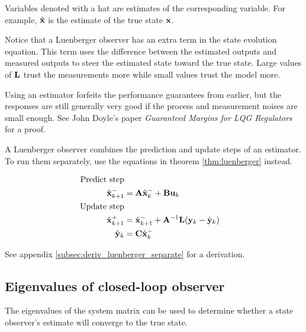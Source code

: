 Variables denoted with a hat are estimates of the corresponding variable. For
example, $\hat{\mathbf{x}}$ is the estimate of the true \gls{state} $\mathbf{x}$.

Notice that a Luenberger \gls{observer} has an extra term in the \gls{state}
evolution equation. This term uses the difference between the estimated
\glspl{output} and measured \glspl{output} to steer the estimated \gls{state}
toward the true \gls{state}. Large values of $\mathbf{L}$ trust the measurements
more while small values trust the \gls{model} more.

\begin{remark}
  Using an estimator forfeits the performance guarantees from earlier, but the
  responses are still generally very good if the process and measurement noises
  are small enough. See John Doyle's paper \textit{Guaranteed Margins for LQG
  Regulators} for a proof.
\end{remark}

A Luenberger \gls{observer} combines the prediction and update steps of an
estimator. To run them separately, use the equations in theorem
\ref{thm:luenberger} instead.

\begin{theorem}
  \label{thm:luenberger}

  \begin{align}
    \text{Predict step} \nonumber \\
    \hat{\mathbf{x}}_{k+1}^- &= \mathbf{A}\hat{\mathbf{x}}_k^- + \mathbf{B}\mathbf{u}_k \\
    \text{Update step} \nonumber \\
    \hat{\mathbf{x}}_{k+1}^+ &= \hat{\mathbf{x}}_{k+1}^- + \mathbf{A}^{-1}\mathbf{L}
      (\mathbf{y}_k - \hat{\mathbf{y}}_k) \\
    \hat{\mathbf{y}}_k &= \mathbf{C} \hat{\mathbf{x}}_k^-
  \end{align}
\end{theorem}

See appendix \ref{subsec:deriv_luenberger_separate} for a derivation.

\subsection{Eigenvalues of closed-loop observer}

The eigenvalues of the system matrix can be used to determine whether a
\gls{state} \gls{observer}'s estimate will converge to the true \gls{state}.

